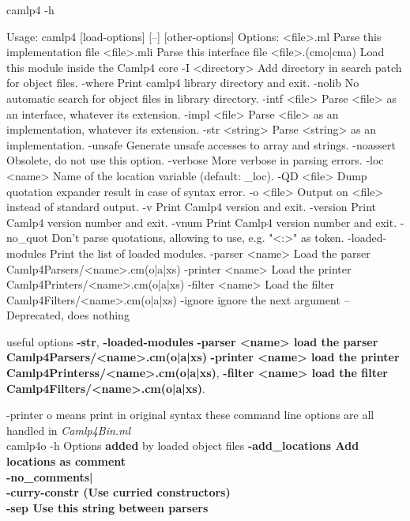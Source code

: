 \begin{enumerate}
\begin{redcode}
camlp4 -h
\end{redcode}
\begin{bluecode}
Usage: camlp4 [load-options] [--] [other-options]
Options:
<file>.ml        Parse this implementation file
<file>.mli       Parse this interface file
<file>.(cmo|cma) Load this module inside the Camlp4 core
  -I <directory>   Add directory in search patch for object files.
  -where           Print camlp4 library directory and exit.
  -nolib           No automatic search for object files in library directory.
  -intf <file>     Parse <file> as an interface, whatever its extension.
  -impl <file>     Parse <file> as an implementation, whatever its extension.
  -str <string>    Parse <string> as an implementation.
  -unsafe          Generate unsafe accesses to array and strings.
  -noassert        Obsolete, do not use this option.
  -verbose         More verbose in parsing errors.
  -loc <name>      Name of the location variable (default: _loc).
  -QD <file>       Dump quotation expander result in case of syntax error.
  -o <file>        Output on <file> instead of standard output.
  -v               Print Camlp4 version and exit.
  -version         Print Camlp4 version number and exit.
  -vnum            Print Camlp4 version number and exit.
  -no_quot         Don't parse quotations, allowing to use, e.g. "<:>" as token.
  -loaded-modules  Print the list of loaded modules.
  -parser <name>   Load the parser Camlp4Parsers/<name>.cm(o|a|xs)
  -printer <name>  Load the printer Camlp4Printers/<name>.cm(o|a|xs)
  -filter <name>   Load the filter Camlp4Filters/<name>.cm(o|a|xs)
  -ignore          ignore the next argument
  --               Deprecated, does nothing    
\end{bluecode}

useful options \textbf{-str}, \textbf{ -loaded-modules } \textbf{ -parser <name> load the parser Camlp4Parsers/<name>.cm(o|a|xs)} \textbf{ -printer <name> load the printer Camlp4Printerss/<name>.cm(o|a|xs)}, \textbf{ -filter <name> load the filter Camlp4Filters/<name>.cm(o|a|xs)}.

  -printer o means print in original syntax 
  these command line options are all handled in \emph{Camlp4Bin.ml } \\

camlp4o -h
Options \textbf{ added} by loaded object files
\textbf{ -add\_locations Add locations as comment} \\
\textbf{ -no\_comments|} \\
\textbf{ -curry-constr (Use curried constructors)} \\
\textbf{ -sep Use this string between parsers} \\


\end{enumerate}

